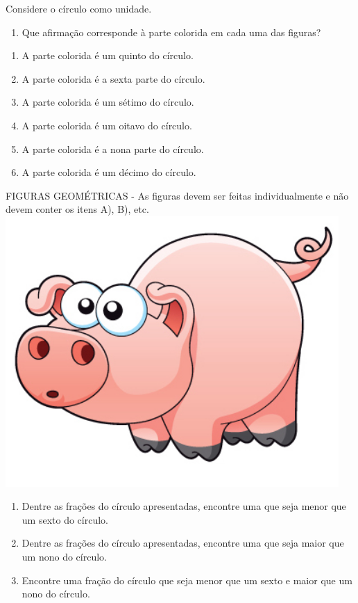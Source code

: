 \documentclass[a4,12pt]{book}
\begin{document}
Considere o círculo como unidade.
\begin{enumerate} [\quad a)] %
  \item      Que afirmação corresponde à parte colorida em cada uma das figuras?
\end{enumerate} %
\mbox{} \newline
\begin{enumerate} [\quad a)] %
  \item    	A parte colorida é um quinto do círculo.
  \item    	A parte colorida é a sexta parte do círculo.
  \item    	A parte colorida é um sétimo do círculo.
  \item    	A parte colorida é um oitavo do círculo.
  \item    	A parte colorida é a nona parte do círculo.
  \item    	A parte colorida é um décimo do círculo.
\end{enumerate} %
\mbox{} \newline  \begin{imagem*}[breakable]{}{}   FIGURAS GEOMÉTRICAS - As figuras devem ser feitas individualmente e não devem conter os itens A), B), etc.
    \includegraphics[width=360pt, keepaspectratio]{pig}
\end{imagem*}\mbox{} \newline
\begin{enumerate} [\quad a)] %
  \item     Dentre as frações do círculo apresentadas, encontre uma que seja menor que um sexto do círculo.
  \item     Dentre as frações do círculo apresentadas, encontre uma que seja maior que um nono do círculo.
  \item     Encontre uma fração do círculo que seja menor que um sexto e maior que um nono do círculo.
\end{enumerate} %
\end{document}
